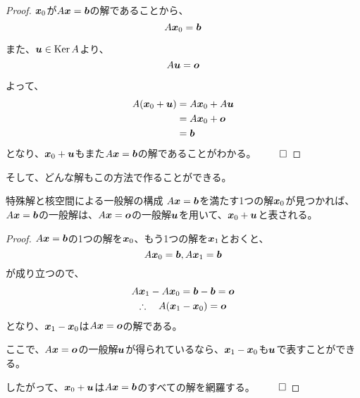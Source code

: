 \documentclass[../../../topic_linear-algebra]{subfiles}
\begin{document}
\begin{proof}
  $\vb*{x}_0$が$A\vb*{x} = \vb*{b}$の解であることから、
  \begin{equation*}
    A\vb*{x}_0 = \vb*{b}
  \end{equation*}

  また、$\vb*{u} \in \operatorname{Ker} A$より、
  \begin{equation*}
    A\vb*{u} = \vb*{o}
  \end{equation*}

  よって、
  \begin{align*}
    A(\vb*{x}_0 + \vb*{u}) & = A\vb*{x}_0 + A\vb*{u} \\
                           & = A\vb*{x}_0 + \vb*{o}  \\
                           & = \vb*{b}
  \end{align*}
  となり、$\vb*{x}_0 + \vb*{u}$もまた$A\vb*{x} = \vb*{b}$の解であることがわかる。 $\qed$
\end{proof}

\br

そして、どんな解もこの方法で作ることができる。

\begin{theorem*}{特殊解と核空間による一般解の構成}
  $A\vb*{x} = \vb*{b}$を満たす1つの解$\vb*{x}_0$が見つかれば、$A\vb*{x} = \vb*{b}$の一般解は、$A\vb*{x} = \vb*{o}$の一般解$\vb*{u}$を用いて、$\vb*{x}_0 + \vb*{u}$と表される。
\end{theorem*}

\begin{proof}
  $A\vb*{x} = \vb*{b}$の1つの解を$\vb*{x}_0$、もう1つの解を$\vb*{x}_1$とおくと、
  \begin{equation*}
    A\vb*{x}_0 = \vb*{b}, A\vb*{x}_1 = \vb*{b}
  \end{equation*}
  が成り立つので、
  \begin{gather*}
    A\vb*{x}_1 - A\vb*{x}_0 = \vb*{b} - \vb*{b} = \vb*{o} \\
    \therefore \quad A(\vb*{x}_1 - \vb*{x}_0) = \vb*{o}
  \end{gather*}
  となり、$\vb*{x}_1 - \vb*{x}_0$は$A\vb*{x} = \vb*{o}$の解である。

  \br

  ここで、$A\vb*{x} = \vb*{o}$の一般解$\vb*{u}$が得られているなら、$\vb*{x}_1 - \vb*{x}_0$も$\vb*{u}$で表すことができる。

  \br

  したがって、$\vb*{x}_0 + \vb*{u}$は$A\vb*{x} = \vb*{b}$のすべての解を網羅する。 $\qed$
\end{proof}
\end{document}
